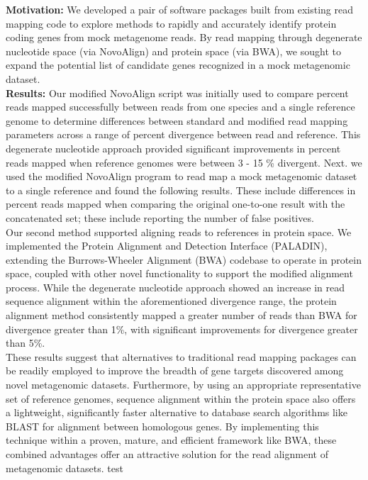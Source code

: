 \textbf{Motivation:} We developed a pair of software packages built from existing read mapping code to explore methods to rapidly and accurately identify protein coding genes from mock metagenome reads. By read mapping through degenerate nucleotide space (via NovoAlign) and protein space (via BWA), we sought to expand the potential list of candidate genes recognized in a mock metagenomic dataset.\\
\textbf{Results:} Our modified NovoAlign script was initially used to compare percent reads mapped successfully between reads from one species and a single reference genome to determine differences between standard and modified read mapping parameters across a range of percent divergence between read and reference. This degenerate nucleotide approach provided significant improvements in percent reads mapped when reference genomes were between 3 - 15 \% divergent. Next. we used the modified NovoAlign program to read map a mock metagenomic dataset to a single reference and found the following results. These include differences in percent reads mapped when comparing the original one-to-one result with the concatenated set; these include reporting the number of false positives. \\

Our second method supported aligning reads to references in protein space.  We implemented the Protein Alignment and Detection Interface (PALADIN), extending the Burrows-Wheeler Alignment (BWA) codebase to operate in protein space, coupled with other novel functionality to support the modified alignment process.  While  the degenerate nucleotide approach showed an increase in read sequence alignment within the aforementioned divergence range, the protein alignment method consistently mapped a greater number of reads than BWA for divergence greater than 1\%, with significant improvements for divergence greater than 5\%.  \\

These results suggest that alternatives to traditional read mapping packages can be readily employed to improve the breadth of gene targets discovered among novel metagenomic datasets. Furthermore, by using an appropriate representative set of reference genomes, sequence alignment within the protein space also offers a lightweight, significantly faster alternative to database search algorithms like BLAST for alignment between homologous genes.  By implementing this technique within a proven, mature, and efficient framework like BWA, these combined advantages offer an attractive solution for the read alignment of metagenomic datasets. test